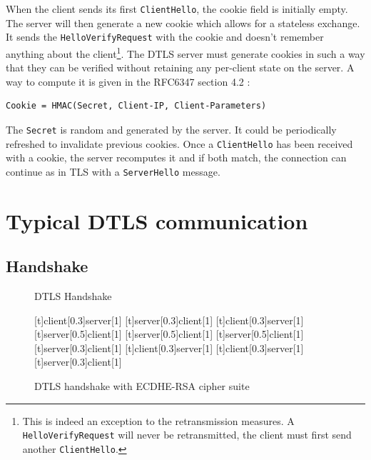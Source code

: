 When the client sends its first \texttt{ClientHello}, the cookie field is initially empty. The server will then generate a new cookie which allows for a stateless exchange. It sends the \texttt{HelloVerifyRequest} with the cookie and doesn't remember anything about the client\footnote{This is indeed an exception to the retransmission measures. A \texttt{HelloVerifyRequest} will never be retransmitted, the client must first send another \texttt{ClientHello}.}. The DTLS server must generate cookies in such a way that they can be verified without retaining any per-client state on the server. A way to compute it is given in the RFC6347 section 4.2 \cite{rfc6347}:

\begin{lstlisting}
Cookie = HMAC(Secret, Client-IP, Client-Parameters)
\end{lstlisting}

The \texttt{Secret} is random and generated by the server. It could be periodically refreshed to invalidate previous cookies. Once a \texttt{ClientHello} has been received with a cookie, the server recomputes it and if both match, the connection can continue as in TLS with a \texttt{ServerHello} message.

\section{Typical DTLS communication}

\subsection{Handshake}

\begin{figure}[!ht]
\centering
\begin{msc}[r]{DTLS Handshake}

\setlength{\instfootheight}{0em}
\setlength{\instheadheight}{0em}
\setlength{\instdist}{0.7\linewidth}
\setlength{\levelheight}{3em}


[t]{client}[0.3]{server}[1]
\nextlevel
{}[t]{server}[0.3]{client}[1]
\nextlevel
{}[t]{client}[0.3]{server}[1]
\nextlevel
{}[t]{server}[0.5]{client}[1]
\nextlevel
{}[t]{server}[0.5]{client}[1]
\nextlevel
{}[t]{server}[0.5]{client}[1]
\nextlevel
{}[t]{server}[0.3]{client}[1]
\nextlevel
{}[t]{client}[0.3]{server}[1]
\nextlevel
{}[t]{client}[0.3]{server}[1]
\nextlevel
{}[t]{server}[0.3]{client}[1]
\nextlevel
\nextlevel
\end{msc}
\caption{DTLS handshake with ECDHE-RSA cipher suite}
\label{fig:dtls-handshake}
\end{figure}


